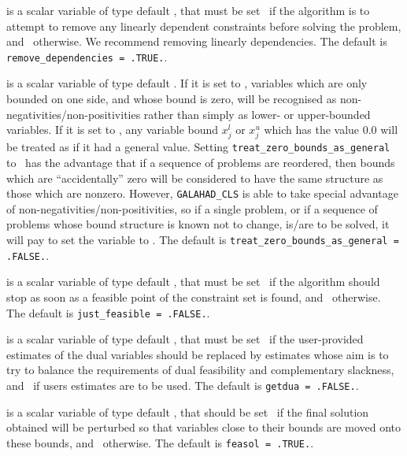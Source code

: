 \documentclass{galahad}
\newcommand{\libraryname}{GALAHAD}
\newcommand{\packagename}{CLS}
\newcommand{\fullpackagename}{\libraryname\_\packagename}
\begin{document}
\begin{description}
 is a scalar variable of type
default \logical, that must be set \true\ if the algorithm
is to attempt to remove any linearly dependent constraints before
solving the problem, and \false\ otherwise.
We recommend removing linearly dependencies.
The default is {\tt remove\_dependencies = .TRUE.}.

 is a scalar variable of type
default \logical.
If it is set to \false, variables which
are only bounded on one side, and whose bound is zero,
will be recognised as non-negativities/non-positivities rather than simply as
lower- or upper-bounded variables.
If it is set to \true, any variable bound
$x_{j}^{l}$ or $x_{j}^{u}$ which has the value 0.0 will be
treated as if it had a general value.
Setting {\tt treat\_zero\_bounds\_as\_general} to \true\ has the advantage
that if a sequence of problems are reordered, then bounds which are
``accidentally'' zero will be considered to have the same structure as
those which are nonzero. However, {\tt \fullpackagename} is
able to take special advantage of non-negativities/non-positivities, so
if a single problem, or if a sequence of problems whose
bound structure is known not to change, is/are to be solved,
it will pay to set the variable to \false.
The default is {\tt treat\_zero\_bounds\_as\_general = .FALSE.}.

 is a scalar variable of type default \logical, that
must be set \true\ if the algorithm should stop as soon as a feasible point
of the constraint set is found, and \false\ otherwise.
The default is {\tt just\_feasible = .FALSE.}.

 is a scalar variable of type default \logical, that
must be set \true\ if the user-provided estimates of the dual variables
should be replaced by estimates whose aim is to try to balance the
requirements of dual feasibility and complementary slackness,
and \false\ if users estimates are to be used.
The default is {\tt getdua = .FALSE.}.

 is a scalar variable of type default \logical, that
should be set \true\
if the final solution obtained will be perturbed
so that variables close to their bounds are moved onto these bounds,
and \false\ otherwise.
The default is {\tt feasol = .TRUE.}.

\end{description}

\end{document}

